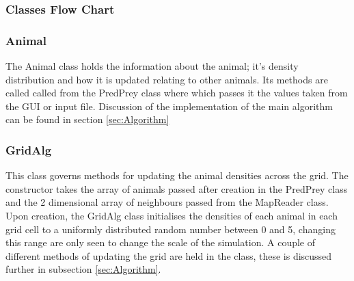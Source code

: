 \documentclass[11pt]{report}
\begin{document}
\subsubsection{Classes Flow Chart}
\begin{center}
\end{center}

\subsubsection{Animal}
\label{sec:Animal}
The Animal class holds the information about the animal; it's density distribution and how it is updated relating to other animals.
Its methods are called called from the PredPrey class where which passes it the values taken from the GUI or input file. Discussion of the implementation of the main algorithm can be found in section \ref{sec:Algorithm}
\subsubsection{GridAlg}
\label{sec:GridAlg}
This class governs methods for updating the animal densities across the grid. The constructor takes the array of animals passed after creation in the PredPrey class and the 2 dimensional array of neighbours passed from the MapReader class. Upon creation, the GridAlg class initialises the densities of each animal in each grid cell to a uniformly distributed random number between 0 and 5, changing this range are only seen to change the scale of the simulation. A couple of different methods of updating the grid are held in the class, these is discussed further in subsection \ref{sec:Algorithm}.
\end{document}
